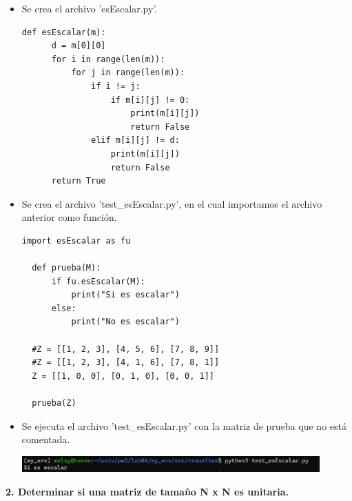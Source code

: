 \documentclass{article}
\begin{document}
  \vspace{\baselineskip}

  \begin{itemize}
  \item Se crea el archivo 'esEscalar.py'.
  
  \begin{lstlisting}[style=python]
  def esEscalar(m):
      d = m[0][0]
      for i in range(len(m)):
          for j in range(len(m)):
              if i != j:
                  if m[i][j] != 0:
                      print(m[i][j])
                      return False
              elif m[i][j] != d:
                  print(m[i][j])
                  return False
      return True
  \end{lstlisting}
  
  \item Se crea el archivo 'test\_esEscalar.py', en el cual importamos el archivo anterior como función.
  
  \begin{lstlisting}[style=python]
  import esEscalar as fu

  def prueba(M):
      if fu.esEscalar(M):
          print("Si es escalar")
      else:
          print("No es escalar")

  #Z = [[1, 2, 3], [4, 5, 6], [7, 8, 9]]
  #Z = [[1, 2, 3], [4, 1, 6], [7, 8, 1]]
  Z = [[1, 0, 0], [0, 1, 0], [0, 0, 1]]

  prueba(Z)
  \end{lstlisting}

  \item Se ejecuta el archivo 'test\_esEscalar.py' con la matriz de prueba que no está comentada.
  
  \begin{minipage}{\linewidth}
    \centering
    \includegraphics[width=0.9\textwidth]{imagenes/r_escalar.png}
  \end{minipage}

  \end{itemize}
    
  \pagebreak

\textbf{2. Determinar si una matriz de tamaño N x N es unitaria.}
  
  \vspace{\baselineskip}
\end{document}
